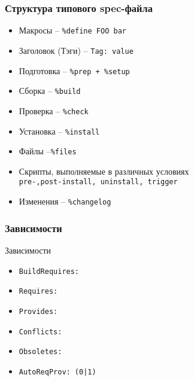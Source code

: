 \begin{frame}
	\frametitle{Структура типового spec-файла}

	\begin{itemize}
		\item Макросы -- {\tt \%define FOO bar}
		\item Заголовок (Тэги) -- {\tt Tag: value}
		\item Подготовка -- {\tt \%prep + \%setup}
		\item Сборка -- {\tt \%build}
		\item Проверка -- {\tt \%check}
		\item Установка -- {\tt \%install}
		\item Файлы --{\tt \%files}
		\item Скрипты, выполняемые в различных условиях\\
			{\tt pre-,post-install, uninstall, trigger}
		\item Изменения -- {\tt \%changelog }
	\end{itemize}

\end{frame}

\begin{frame}
	\frametitle{Зависимости}

	\begin{block}{ Зависимости}
		\begin{itemize}
			\item {\tt BuildRequires:}
			\item {\tt Requires:}
			\item {\tt Provides:}
			\item {\tt Conflicts:}
			\item {\tt Obsoletes:}
			\item {\tt AutoReqProv: (0|1)}
		\end{itemize}
	\end{block}

\end{frame}

